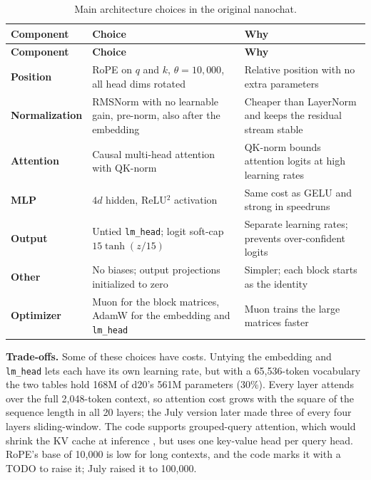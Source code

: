 \documentclass[11pt]{article}
\newcommand{\code}[1]{\texttt{#1}}
\begin{document}
{\small
\renewcommand{\arraystretch}{1.3}
\begin{longtable}{L{2.6cm} L{6.0cm} L{5.6cm}}
\caption{Main architecture choices in the original nanochat.}\label{tab:oct}\\
\toprule
\textbf{Component} & \textbf{Choice} & \textbf{Why} \\
\midrule
\endfirsthead

\toprule
\textbf{Component} & \textbf{Choice} & \textbf{Why} \\
\midrule
\endhead

\bottomrule
\endfoot

\textbf{Position} & RoPE on $q$ and $k$, $\theta = 10{,}000$, all head dims rotated \cite{roformer} & Relative position with no extra parameters \\
\midrule
\textbf{Normalization} & RMSNorm with no learnable gain, pre-norm, also after the embedding \cite{rmsnorm} & Cheaper than LayerNorm and keeps the residual stream stable \\
\midrule
\textbf{Attention} & Causal multi-head attention with QK-norm \cite{qknorm} & QK-norm bounds attention logits at high learning rates \\
\midrule
\textbf{MLP} & $4d$ hidden, ReLU$^2$ activation \cite{primer} & Same cost as GELU and strong in speedruns \\
\midrule
\textbf{Output} & Untied \code{lm\_head}; logit soft-cap $15\tanh(z/15)$ \cite{gemma2} & Separate learning rates; prevents over-confident logits \\
\midrule
\textbf{Other} & No biases; output projections initialized to zero & Simpler; each block starts as the identity \\
\midrule
\textbf{Optimizer} & Muon \cite{muon} for the block matrices, AdamW \cite{adamw} for the embedding and \code{lm\_head} & Muon trains the large matrices faster \\

\end{longtable}
}

\textbf{Trade-offs.} Some of these choices have costs. Untying the embedding and \code{lm\_head} lets each have its own learning rate, but with a 65,536-token vocabulary the two tables hold 168M of d20's 561M parameters (30\%). Every layer attends over the full 2,048-token context, so attention cost grows with the square of the sequence length in all 20 layers; the July version later made three of every four layers sliding-window. The code supports grouped-query attention, which would shrink the KV cache at inference \cite{gqa}, but uses one key-value head per query head. RoPE's base of 10,000 is low for long contexts, and the code marks it with a TODO to raise it; July raised it to 100,000.
\end{document}
